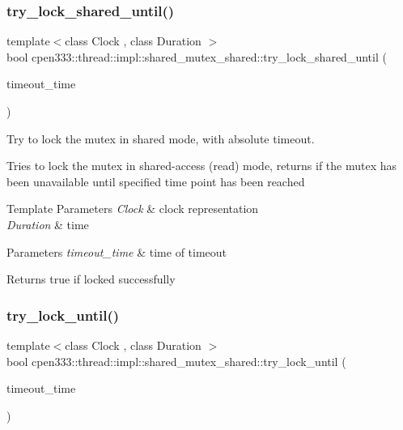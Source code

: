 \subsubsection{\texorpdfstring{try\+\_\+lock\+\_\+shared\+\_\+until()}{try\_lock\_shared\_until()}}
{\footnotesize\ttfamily template$<$class Clock , class Duration $>$ \\
bool cpen333\+::thread\+::impl\+::shared\+\_\+mutex\+\_\+shared\+::try\+\_\+lock\+\_\+shared\+\_\+until (\begin{DoxyParamCaption}\item[{const std\+::chrono\+::time\+\_\+point$<$ Clock, Duration $>$ \&}]{timeout\+\_\+time }\end{DoxyParamCaption})\hspace{0.3cm}{\ttfamily [inline]}}



Try to lock the mutex in shared mode, with absolute timeout. 

Tries to lock the mutex in shared-\/access (read) mode, returns if the mutex has been unavailable until specified time point has been reached


\begin{DoxyTemplParams}{Template Parameters}
{\em Clock} & clock representation \\
\hline
{\em Duration} & time \\
\hline
\end{DoxyTemplParams}

\begin{DoxyParams}{Parameters}
{\em timeout\+\_\+time} & time of timeout \\
\hline
\end{DoxyParams}
\begin{DoxyReturn}{Returns}
true if locked successfully 
\end{DoxyReturn}
\mbox{\label{classcpen333_1_1thread_1_1impl_1_1shared__mutex__shared_a58baad110b6dfb6bc036a46f846f9f00}} 
\subsubsection{\texorpdfstring{try\+\_\+lock\+\_\+until()}{try\_lock\_until()}}
{\footnotesize\ttfamily template$<$class Clock , class Duration $>$ \\
bool cpen333\+::thread\+::impl\+::shared\+\_\+mutex\+\_\+shared\+::try\+\_\+lock\+\_\+until (\begin{DoxyParamCaption}\item[{const std\+::chrono\+::time\+\_\+point$<$ Clock, Duration $>$ \&}]{timeout\+\_\+time }\end{DoxyParamCaption})\hspace{0.3cm}{\ttfamily [inline]}}



